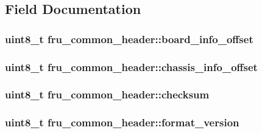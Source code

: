 \subsection{Field Documentation}
\hypertarget{structfru__common__header_a4c54e9061160526a130eae1932683238}{
\subsubsection[{board\-\_\-info\-\_\-offset}]{\setlength{\rightskip}{0pt plus 5cm}uint8\-\_\-t fru\-\_\-common\-\_\-header\-::board\-\_\-info\-\_\-offset}}\label{structfru__common__header_a4c54e9061160526a130eae1932683238}
\hypertarget{structfru__common__header_a2f10e49eacdef7036875fa43c7630328}{
\subsubsection[{chassis\-\_\-info\-\_\-offset}]{\setlength{\rightskip}{0pt plus 5cm}uint8\-\_\-t fru\-\_\-common\-\_\-header\-::chassis\-\_\-info\-\_\-offset}}\label{structfru__common__header_a2f10e49eacdef7036875fa43c7630328}
\hypertarget{structfru__common__header_a32410dd1bbb78c5588a7e96ddd1d4aba}{
\subsubsection[{checksum}]{\setlength{\rightskip}{0pt plus 5cm}uint8\-\_\-t fru\-\_\-common\-\_\-header\-::checksum}}\label{structfru__common__header_a32410dd1bbb78c5588a7e96ddd1d4aba}
\hypertarget{structfru__common__header_a090541d964200c54c3f2faaab395cf33}{
\subsubsection[{format\-\_\-version}]{\setlength{\rightskip}{0pt plus 5cm}uint8\-\_\-t fru\-\_\-common\-\_\-header\-::format\-\_\-version}}\label{structfru__common__header_a090541d964200c54c3f2faaab395cf33}

